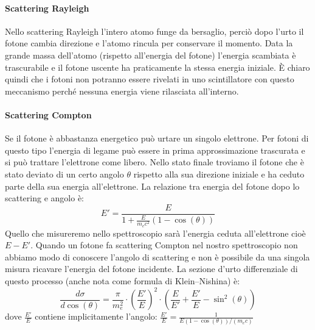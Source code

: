  \paragraph{Scattering Rayleigh}
 Nello scattering Rayleigh l'intero atomo funge da bersaglio, perciò dopo l'urto il fotone cambia direzione e l'atomo rincula per conservare il momento. Data la grande massa dell'atomo (rispetto all'energia del fotone) l'energia scambiata è trascurabile e il fotone uscente ha praticamente la stessa energia iniziale. \`E chiaro quindi che i fotoni non potranno essere rivelati in uno scintillatore con questo meccanismo perché nessuna energia viene rilasciata all'interno.
 
 \paragraph{Scattering Compton}
 Se il fotone è abbastanza energetico può urtare un singolo elettrone. Per fotoni di questo tipo l'energia di legame può essere in prima approssimazione trascurata e si può trattare l'elettrone come libero. Nello stato finale troviamo il fotone che è stato deviato di un certo angolo $\theta$ rispetto alla sua direzione iniziale e ha ceduto parte della sua energia all'elettrone. La relazione tra energia del fotone dopo lo scattering e angolo è:
 \begin{equation}
 \label{energia_compton}
 E' = \frac{E}{1+\frac{E}{m_ec^2}(1-\cos(\theta))}   
 \end{equation}
 Quello che misureremo nello spettroscopio sarà l'energia ceduta all'elettrone cioè $E-E'$. Quando un fotone fa scattering Compton nel nostro spettroscopio non abbiamo modo di conoscere l'angolo di scattering e non è possibile da una singola misura ricavare l'energia del fotone incidente.
 La sezione d'urto differenziale di questo processo (anche nota come formula di Klein–Nishina) è:
 \begin{equation}
 \label{klein-nishina}
 \frac{d\sigma}{d\cos(\theta)} = \frac{\pi}{m_e^2} \cdot\left(\frac{E'}{E}\right)^2 \cdot \left(\frac{E}{E'} + \frac{E'}{E} - \sin^2(\theta)\right)
 \end{equation}
 dove $\frac{E'}{E}$ contiene implicitamente l'angolo: $\frac{E'}{E} = \frac{1}{E(1-\cos(\theta))/(m_ec)}$
 
